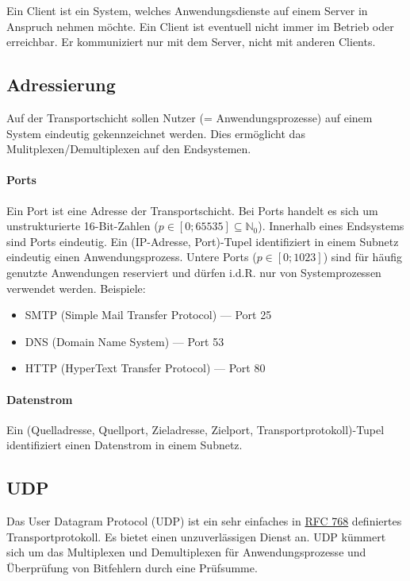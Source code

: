 \documentclass[a4paper, 14pt]{article}
\begin{document}
	Ein Client ist ein System, welches Anwendungsdienste auf einem Server in Anspruch nehmen möchte.
	Ein Client ist eventuell nicht immer im Betrieb oder erreichbar.
	Er kommuniziert nur mit dem Server, nicht mit anderen Clients.

	\subsection{Adressierung}

	Auf der Transportschicht sollen Nutzer (= Anwendungsprozesse) auf einem System eindeutig gekennzeichnet werden.
	Dies ermöglicht das Mulitplexen/Demultiplexen auf den Endsystemen.

	\paragraph{Ports}

	Ein Port ist eine Adresse der Transportschicht.
	Bei Ports handelt es sich um unstrukturierte 16-Bit-Zahlen ($p \in \left[0; 65535\right] \subseteq \mathbb{N}_0$).
	Innerhalb eines Endsystems sind Ports eindeutig.
	Ein (IP-Adresse, Port)-Tupel identifiziert in einem Subnetz eindeutig einen Anwendungsprozess.
	Untere Ports ($p \in \left[0; 1023\right]$) sind für häufig genutzte Anwendungen reserviert und dürfen i.d.R. nur von Systemprozessen verwendet werden.
	Beispiele:

	\begin{itemize}
		\item SMTP (Simple Mail Transfer Protocol) --- Port 25
		\item DNS (Domain Name System) --- Port 53
		\item HTTP (HyperText Transfer Protocol) --- Port 80
	\end{itemize}

	\paragraph{Datenstrom}

	Ein (Quelladresse, Quellport, Zieladresse, Zielport, Transportprotokoll)-Tupel identifiziert einen Datenstrom in einem Subnetz.

	\subsection{UDP}

	Das User Datagram Protocol (UDP) ist ein sehr einfaches in \href{https://tools.ietf.org/html/rfc768}{RFC 768} definiertes Transportprotokoll.
	Es bietet einen unzuverlässigen Dienst an.
	UDP kümmert sich um das Multiplexen und Demultiplexen für Anwendungsprozesse und Überprüfung von Bitfehlern durch eine Prüfsumme.
\end{document}

